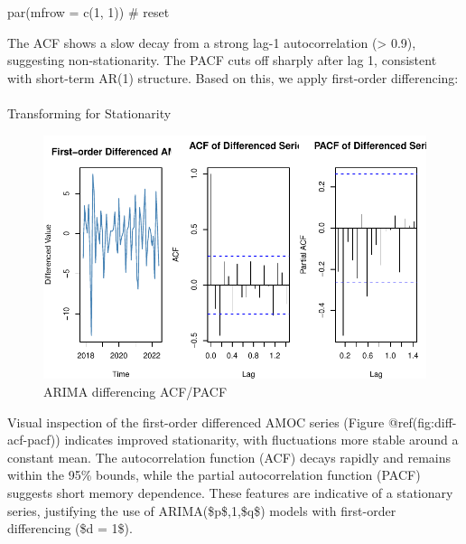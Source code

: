 \documentclass[
  11pt,
]{article}
\makeatletter
\let\oldparagraph\paragraph
\renewcommand{\paragraph}{
    \@ifstar
      \xxxParagraphStar
      \xxxParagraphNoStar
  }
\newcommand{\xxxParagraphStar}[1]{\oldparagraph*{#1}\mbox{}}
\newcommand{\xxxParagraphNoStar}[1]{\oldparagraph{#1}\mbox{}}
\newenvironment{Shaded}{\begin{snugshade}}{\end{snugshade}}
\newcommand{\AttributeTok}[1]{\textcolor[rgb]{0.40,0.45,0.13}{#1}}
\newcommand{\CommentTok}[1]{\textcolor[rgb]{0.37,0.37,0.37}{#1}}
\newcommand{\DecValTok}[1]{\textcolor[rgb]{0.68,0.00,0.00}{#1}}
\newcommand{\FunctionTok}[1]{\textcolor[rgb]{0.28,0.35,0.67}{#1}}
\newcommand{\NormalTok}[1]{\textcolor[rgb]{0.00,0.23,0.31}{#1}}
\makeatother
\begin{document}
\begin{Shaded}
\begin{Highlighting}[]
\FunctionTok{par}\NormalTok{(}\AttributeTok{mfrow =} \FunctionTok{c}\NormalTok{(}\DecValTok{1}\NormalTok{, }\DecValTok{1}\NormalTok{))  }\CommentTok{\# reset}
\end{Highlighting}
\end{Shaded}

The ACF shows a slow decay from a strong lag-1 autocorrelation
(\textgreater{} 0.9), suggesting non-stationarity. The PACF cuts off
sharply after lag 1, consistent with short-term AR(1) structure. Based
on this, we apply first-order differencing:

\paragraph{Transforming for
Stationarity}\label{transforming-for-stationarity}

\begin{figure}[H]

{\centering \includegraphics{project_files/figure-pdf/fig-diff-acf-pacf-1.pdf}

}

\caption{ARIMA differencing ACF/PACF}

\end{figure}%

Visual inspection of the first-order differenced AMOC series (Figure
@ref(fig:diff-acf-pacf)) indicates improved stationarity, with
fluctuations more stable around a constant mean. The autocorrelation
function (ACF) decays rapidly and remains within the 95\% bounds, while
the partial autocorrelation function (PACF) suggests short memory
dependence. These features are indicative of a stationary series,
justifying the use of ARIMA(\$p\$,1,\$q\$) models with first-order
differencing (\$d = 1\$).
\end{document}

